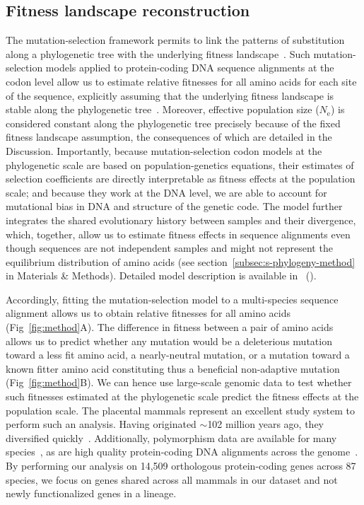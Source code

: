 \documentclass[10pt,letterpaper]{article}
\newcommand{\Ne}{N_{\text{e}}}
\begin{document}
\subsection*{Fitness landscape reconstruction}

The mutation-selection framework permits to link the patterns of substitution along a phylogenetic tree with the underlying fitness landscape~\cite{halpern_evolutionary_1998, mccandlish_modeling_2014}.
Such mutation-selection models applied to protein-coding DNA sequence alignments at the codon level allow us to estimate relative fitnesses for all amino acids for each site of the sequence, explicitly assuming that the underlying fitness landscape is stable along the phylogenetic tree~\cite{rodrigue_mechanistic_2010, tamuri_estimating_2012, rodrigue_detecting_2017}.
Moreover, effective population size ($\Ne$) is considered constant along the phylogenetic tree precisely because of the fixed fitness landscape assumption, the consequences of which are detailed in the Discussion.
Importantly, because mutation-selection codon models at the phylogenetic scale are based on population-genetics equations, their estimates of selection coefficients are directly interpretable as fitness effects at the population scale; and because they work at the DNA level, we are able to account for mutational bias in DNA and structure of the genetic code.
The model further integrates the shared evolutionary history between samples and their divergence, which, together, allow us to estimate fitness effects in sequence alignments even though sequences are not independent samples and might not represent the equilibrium distribution of amino acids (see section~\ref{subsec:s-phylogeny-method} in Materials \& Methods).
Detailed model description is available in~ ().

Accordingly, fitting the mutation-selection model to a multi-species sequence alignment allows us to obtain relative fitnesses for all amino acids (Fig~\ref{fig:method}A).
The difference in fitness between a pair of amino acids allows us to predict whether any mutation would be a deleterious mutation toward a less fit amino acid, a nearly-neutral mutation, or a mutation toward a known fitter amino acid constituting thus a beneficial non-adaptive mutation (Fig~\ref{fig:method}B).
We can hence use large-scale genomic data to test whether such fitnesses estimated at the phylogenetic scale predict the fitness effects at the population scale.
The placental mammals represent an excellent study system to perform such an analysis.
Having originated $\sim$102 million years ago, they diversified quickly~\cite{foley_genomic_2023}.
Additionally, polymorphism data are available for many species~\cite{howe_ensembl_2021}, as are high quality protein-coding DNA alignments across the genome~\cite{ranwez_orthomam_2007, scornavacca_orthomam_2019}.
By performing our analysis on 14,509 orthologous protein-coding genes across 87 species, we focus on genes shared across all mammals in our dataset and not newly functionalized genes in a lineage.
\end{document}
